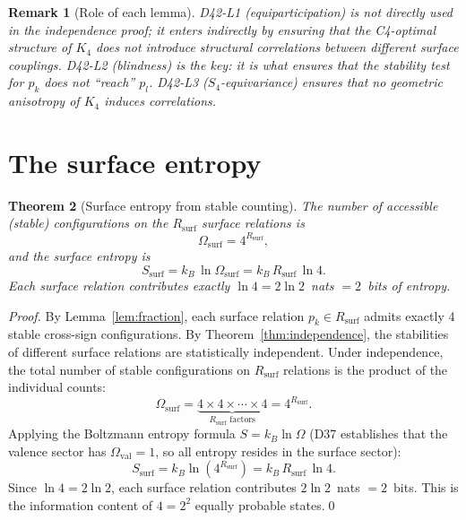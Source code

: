 \documentclass[12pt,a4paper]{article}
\newtheorem{theorem}{Theorem}[section]
\newtheorem{remark}[theorem]{Remark}
\newcommand{\Kfour}{K_4}
\newcommand{\Rsurf}{R_{\mathrm{surf}}}
\newcommand{\Omegasurf}{\Omega_{\mathrm{surf}}}
\newcommand{\Ssurf}{S_{\mathrm{surf}}}
\begin{document}
\begin{remark}[Role of each lemma]
D42-L1 (equiparticipation) is not directly used in the independence proof; it enters indirectly by ensuring that the C4-optimal structure of $\Kfour$ does not introduce structural correlations between different surface couplings. D42-L2 (blindness) is the key: it is what ensures that the stability test for $p_k$ does not ``reach'' $p_l$. D42-L3 ($S_4$-equivariance) ensures that no geometric anisotropy of $\Kfour$ induces correlations.
\end{remark}

\section{The surface entropy}
\label{sec:entropy}

\begin{theorem}[Surface entropy from stable counting]
\label{thm:entropy}
The number of \emph{accessible} (stable) configurations on the $\Rsurf$ surface relations is
\begin{equation}
\Omegasurf = 4^{\Rsurf},
\label{eq:Omega}
\end{equation}
and the surface entropy is
\begin{equation}
\Ssurf = k_B\,\ln\Omegasurf = k_B\,\Rsurf\,\ln 4.
\label{eq:Ssurf}
\end{equation}
Each surface relation contributes exactly $\ln 4 = 2\ln 2$~nats $= 2$~bits of entropy.
\end{theorem}

\begin{proof}
By Lemma~\ref{lem:fraction}, each surface relation $p_k \in \Rsurf$ admits exactly 4 stable cross-sign configurations. By Theorem~\ref{thm:independence}, the stabilities of different surface relations are statistically independent. Under independence, the total number of stable configurations on $\Rsurf$ relations is the product of the individual counts:
\begin{equation}
\Omegasurf = \underbrace{4 \times 4 \times \cdots \times 4}_{\Rsurf \text{ factors}} = 4^{\Rsurf}.
\end{equation}
Applying the Boltzmann entropy formula $S = k_B\ln\Omega$ (D37 establishes that the valence sector has $\Omega_{\mathrm{val}} = 1$, so all entropy resides in the surface sector):
\begin{equation}
\Ssurf = k_B\ln(4^{\Rsurf}) = k_B\,\Rsurf\,\ln 4.
\end{equation}
Since $\ln 4 = 2\ln 2$, each surface relation contributes $2\ln 2$~nats $= 2$~bits. This is the information content of $4 = 2^2$ equally probable states.\qed
\end{proof}
\end{document}
